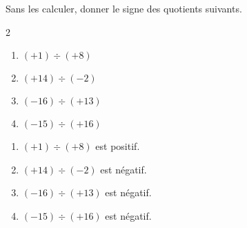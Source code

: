 \begin{exercice*}
    Sans les calculer, donner le signe des quotients suivants.
    \begin{multicols}2
        \begin{enumerate}
            \item $ (+1) \div (+8) $
            \item $ (+14)\div (-2) $
            \item $ (-16)\div (+13) $
            \item $ (-15)\div (+16) $
        \end{enumerate}
    \end{multicols}
\end{exercice*}
\begin{corrige}
        \begin{enumerate}
            \item $ (+1) \div (+8) $ est positif.
            \item $ (+14)\div (-2) $ est négatif.
            \item $ (-16)\div (+13) $ est négatif.
            \item $ (-15)\div (+16) $ est négatif.
        \end{enumerate}
\end{corrige}

